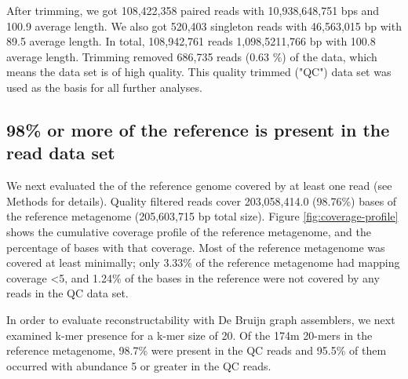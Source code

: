 \documentclass[10pt,a4paper,twocolumn]{article}
\begin{document}
After trimming, we got 108,422,358 paired reads with 10,938,648,751 bps  and 100.9 average length. We also got 520,403 singleton reads  with 46,563,015 bp with 89.5 average length. In total,  108,942,761 reads 1,098,5211,766 bp  with 100.8 average length. 
Trimming removed 686,735 reads (0.63 \%) of the data, which means the data set is of high quality. This quality trimmed ("QC") data set was used as the basis for
all further analyses.




\subsection*{98\% or more of the reference is present in the read data set}

We next evaluated the of the reference genome covered by at least
one read (see Methods for details). Quality filtered reads cover
203,058,414.0 (98.76\%) bases of the reference metagenome (205,603,715
bp total size).  Figure \ref{fig:coverage-profile} shows the
cumulative coverage profile of the reference metagenome, and the
percentage of bases with that coverage. Most of the reference
metagenome was covered at least minimally; only 3.33\% of the
reference metagenome had mapping coverage \textless 5, and 1.24\% of
the bases in the reference were not covered by any reads in the QC data
set.

In order to evaluate reconstructability with De Bruijn graph
assemblers, we next examined k-mer presence for a k-mer size of 20. Of
the 174m 20-mers in the reference metagenome, 98.7\% were present in the
QC reads and 95.5\% of them occurred with abundance 5 or greater in
the QC reads.
\end{document}
